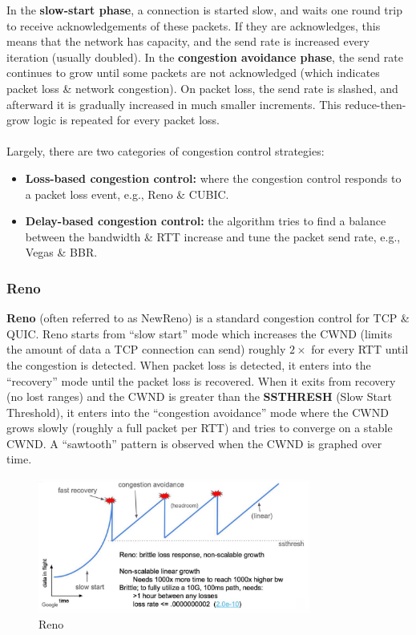 \documentclass[a4paper,11pt]{article}
\begin{document}
In the \textbf{slow-start phase}, a connection is started slow, and waits one round trip to receive acknowledgements of these packets.
If they are acknowledges, this means that the network has capacity, and the send rate is increased every iteration (usually doubled).
In the \textbf{congestion avoidance phase}, the send rate continues to grow until some packets are not acknowledged (which indicates packet loss \& network congestion).
On packet loss, the send rate is slashed, and afterward it is gradually increased in much smaller increments.
This reduce-then-grow logic is repeated for every packet loss.
\\\\
Largely, there are two categories of congestion control strategies:
\begin{itemize}
    \item   \textbf{Loss-based congestion control:} where the congestion control responds to a packet loss event, e.g., Reno \& CUBIC.
    \item   \textbf{Delay-based congestion control:} the algorithm tries to find a balance between the bandwidth \& RTT increase and tune the packet send rate, e.g., Vegas \& BBR.
\end{itemize}

\subsubsection{Reno}
\textbf{Reno} (often referred to as NewReno) is a standard congestion control for TCP \& QUIC.
Reno starts from ``slow start'' mode which increases the CWND (limits the amount of data a TCP connection can send) roughly $2 \times$  for every RTT until the congestion is detected.
When packet loss is detected, it enters into the ``recovery'' mode until the packet loss is recovered.
When it exits from recovery (no lost ranges) and the CWND is greater than the \textbf{SSTHRESH} (Slow Start Threshold), it enters into the ``congestion avoidance'' mode where the CWND grows slowly (roughly a full packet per RTT) and tries to converge on a stable CWND.
A ``sawtooth'' pattern is observed when the CWND is graphed over time.

\begin{figure}[H]
    \centering
    \includegraphics[width=0.8\textwidth]{./images/reno.png}
    \caption{Reno}
\end{figure}
\end{document}
